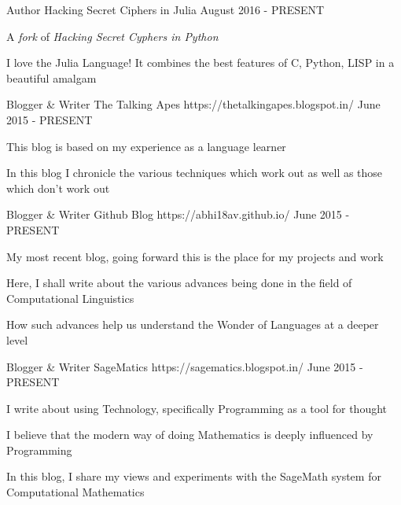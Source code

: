 \begin{cventries}
  \cventry
    {Author}
    {Hacking Secret Ciphers in Julia}
    {}
    {August 2016 - PRESENT}
    {
      \begin{cvitems}
        \item {A \textit{fork} of\textit{ Hacking Secret Cyphers in Python}}
        \item {I love the Julia Language! It combines the best features of C, Python, LISP in a beautiful amalgam}
      \end{cvitems}
    }

  \cventry
    {Blogger \& Writer}
    {The Talking Apes}
    {https://thetalkingapes.blogspot.in/}
    {June 2015 - PRESENT}
    {
      \begin{cvitems}
        \item {This blog is based on my experience as a language learner}
        \item {In this blog I chronicle the various techniques which work out as well as those which don't work out}
      \end{cvitems}
    }
    
  \cventry
    {Blogger \& Writer}
    {Github Blog}
    {https://abhi18av.github.io/}
    {June 2015 - PRESENT}
    {
      \begin{cvitems}
        \item {My most recent blog, going forward this is the place for my projects and work}
        \item {Here, I shall write about the various advances being done in the field of Computational Linguistics}
		\item {How such advances help us understand the Wonder of Languages at a deeper level}        
      \end{cvitems}
    }    
    
  \cventry
    {Blogger \& Writer}
    {SageMatics}
    {https://sagematics.blogspot.in/}
    {June 2015 - PRESENT}
    {
      \begin{cvitems}
        \item {I write about using Technology, specifically Programming as a tool for thought}
        \item {I believe that the modern way of doing Mathematics is deeply influenced by Programming}
        \item {In this blog, I share my views and experiments with the SageMath system for Computational Mathematics}
      \end{cvitems}
    }
    
    

\end{cventries}
